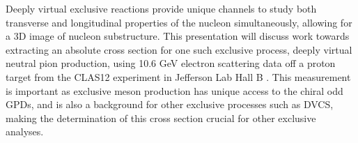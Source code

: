 % 
% 
%
Deeply virtual exclusive reactions provide unique channels to study both transverse and longitudinal properties of the nucleon simultaneously, allowing for a 3D image of nucleon substructure. This presentation will discuss work towards extracting an absolute cross section for one such exclusive process, deeply virtual neutral pion production, using 10.6 GeV electron scattering data off a proton target from the CLAS12 experiment in Jefferson Lab Hall B . This measurement is important as exclusive meson production has unique access to the chiral odd GPDs, and is also a background for other exclusive processes such as DVCS, making the determination of this cross section crucial for other exclusive analyses.
